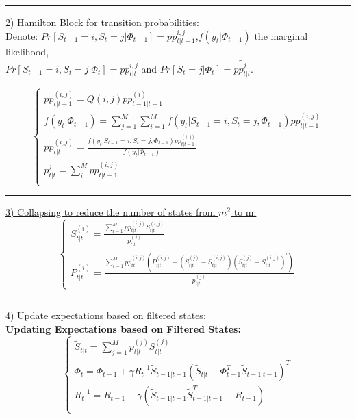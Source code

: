 \documentclass[12pt,reqno]{article}
\numberwithin{equation}{section}
\begin{document}
\begin{table}[H]
\vspace{5 mm}
\noindent\rule{\textwidth}{1pt}
\noindent
\underline{2)  Hamilton Block for transition probabilities:}\ \\

\noindent
Denote: $ Pr[S_{t-1}=i,S_t=j | \Phi_{t-1} ] = pp_{t|t-1}^{i,j} $,$f(y_t|\Phi_{t-1}) $ the marginal likelihood,\\ $Pr[S_{t-1}=i,S_t=j|\Phi_t]= pp_{t|t}^{i,j} $ and  $Pr[S_t=j|\Phi_t]= \tilde{pp_{t|t}^{j}}$.

$$
\begin{cases}
pp_{t|t-1}^{(i,j)}=Q(i,j) pp_{t-1|t-1}^{(i)} \\
f(y_t|\Phi_{t-1}) = \sum_{j=1}^M \sum_{i=1}^M f(y_t | S_{t-1}=i, S_t=j, \Phi_{t-1} ) pp_{t|t-1}^{(i,j)} \\
pp_{t|t}^{(i,j)} = \frac{f(y_t | S_{t-1} = i, S_t = j, \Phi_{t-1}) pp_{t|t-1}^{(i,j)} } { f(y_t| \Phi_{t-1})} \\
p_{t|t}^{j} = \sum_{i}^M pp_{t|t-1}^{(i,j)}\\
\end{cases}
$$

\noindent\rule{\textwidth}{1pt}
\noindent
\underline{3) Collapsing to reduce the number of states from $m^2 $ to m:} \\
$$
\begin{cases}
{S}_{t|t}^{(i)} = \frac{\sum_{i=1}^M pp_{t|t}^{(i,j)} S_{t|t}^{(i,j)} } { p_{t|t}^{(j)}} \\
{P}_{t|t}^{(i)}= \frac{\sum_{i=1}^M pp_{tt}^{(i,j)} (P_{t|t}^{(i,j)} + (S_{t|t}^{(j)} - S_{t|t}^{(i,j)})(S_{t|t}^{(j)} - S_{t|t}^{(i,j)})^{\prime})}{p_{t|t}^{(j)}}
\end{cases}
$$

\noindent\rule{\textwidth}{1pt}
\noindent
\underline{4) Update expectations based on filtered states:} \\

\textbf{Updating Expectations based on Filtered States:}
$$
\begin{cases}
\tilde{S}_{t|t} = \sum_{j=1}^M p_{t|t}^{(j)} S_{t|t}^{(j)}\\
\Phi_t = \Phi_{t-1} + \gamma R_t^{-1} \tilde{S}_{t-1|t-1}(\tilde{S}_{t|t}- \Phi_{t-1}^{T} \tilde{S}_{t-1|t-1})^{T} \\
R_t^{-1} = R_{t-1} + \gamma (\tilde{S}_{t-1|t-1}\tilde{S}_{t-1|t-1}^{T} - R_{t-1}) \\
\end{cases}
$$

\end{table}
\end{document}
